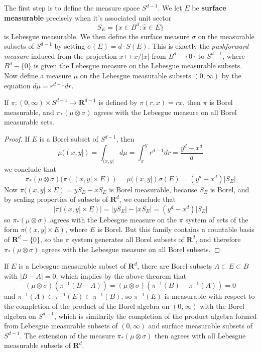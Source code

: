 The first step is to define the measure space $S^{d-1}$. We let $E$ be {\bf surface measurable} precisely when it's associated unit sector
%
\[ S_E = \{ x \in B^d: \hat{x} \in E \} \]
%
is Lebesgue measurable. We then define the surface measure $\sigma$ on the measurable subsets of $S^{d-1}$ by setting $\sigma(E) = d \cdot S(E)$. This is exactly the {\it pushforward measure} induced from the projection $x \mapsto x/|x|$ from $B^d - \{ 0 \}$ to $S^{d-1}$, where $B^d - \{ 0 \}$ is given the Lebesgue measure on the Lebesgue measurable subsets. Now define a measure $\mu$ on the Lebesgue measurable subsets $(0,\infty)$ by the equation $d\mu = r^{d-1} dr$.

\begin{lemma}
    If $\pi: (0,\infty) \times S^{d-1} \to \mathbf{R}^{d-1}$ is defined by $\pi(r,x) = rx$, then $\pi$ is Borel measurable, and $\pi_*(\mu \otimes \sigma)$ agrees with the Lebesgue measure on all Borel measurable sets.
\end{lemma}
\begin{proof}
    If $E$ is a Borel subset of $S^{d-1}$, then
    \[ \mu((x,y]) = \int_{(x,y]} d\mu = \int_x^y r^{d-1} dr = \frac{y^d - x^d}{d} \]
    we conclude that
    \[ \pi_*(\mu \otimes \sigma)(\pi((x,y] \times E)) = \mu((x,y]) \sigma(E) = (y^d - x^d) |S_E| \]
    Now $\pi((x,y] \times E) = yS_E - xS_E$ is Borel measurable, because $S_E$ is Borel, and by scaling properties of subsets of $\mathbf{R}^d$, we conclude that
    \[ |\pi((x,y] \times E)| = |yS_E| - |xS_E| = (y^d - x^d)|S_E| \]
    so $\pi_*(\mu \otimes \sigma)$ agrees with the Lebesgue measure on the $\pi$ system of sets of the form $\pi((x,y] \times E)$, where $E$ is Borel. But this family contains a countable basis of $\mathbf{R}^d - \{ 0 \}$, so the $\pi$ system generates all Borel subsets of $\mathbf{R}^d$, and therefore $\pi_*(\mu \otimes \sigma)$ agrees with the Lebesgue measure on all Borel subsets.
\end{proof}

If $E$ is a Lebesgue measurable subset of $\mathbf{R}^d$, there are Borel subsets $A \subset E \subset B$ with $|B - A| = 0$, which implies by the above theorem that
%
\[ (\mu \otimes \sigma)(\pi^{-1}(B - A)) = (\mu \otimes \sigma)(\pi^{-1}(B) - \pi^{-1}(A)) = 0 \]
%
and $\pi^{-1}(A) \subset \pi^{-1}(E) \subset \pi^{-1}(B)$, so $\pi^{-1}(E)$ is measurable with respect to the completion of the product of the Borel algebra on $(0,\infty)$ with the Borel algebra on $S^{d-1}$, which is similarily the completion of the product algebra formed from Lebesgue measurable subsets of $(0,\infty)$ and surface measurable subsets of $S^{d-1}$. The extension of the measure $\pi_*(\mu \otimes \sigma)$ then agrees with all Lebesgue measurable subsets of $\mathbf{R}^d$.

